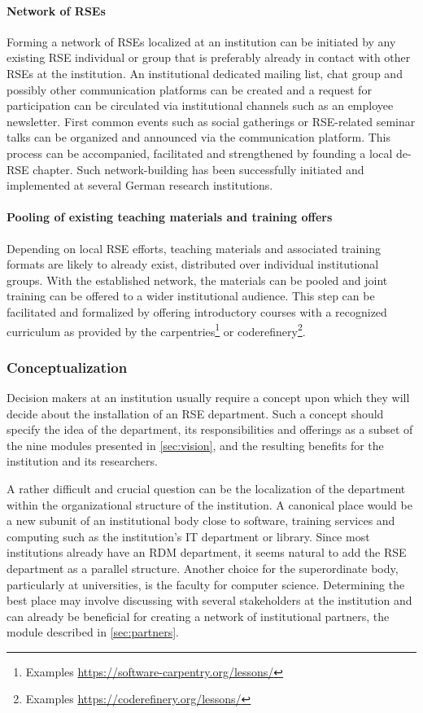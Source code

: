 \documentclass[a4paper]{article}
\begin{document}
\paragraph{Network of RSEs}
Forming a network of RSEs localized at an institution can be initiated by any existing RSE individual or group that is preferably already in contact with other RSEs at the institution.
An institutional dedicated mailing list, chat group and possibly other communication platforms can be created and a request for participation can be circulated via institutional channels such as an employee newsletter.
First common events such as social gatherings or RSE-related seminar talks can be organized and announced via the communication platform.
This process can be accompanied, facilitated and strengthened by founding a local de-RSE chapter.
Such network-building has been successfully initiated and implemented at several German research institutions.

\paragraph{Pooling of existing teaching materials and training offers}
Depending on local RSE efforts, teaching materials and associated training formats are likely to already exist,
distributed over individual institutional groups.
With the established network, the materials can be pooled and joint training can be offered to a wider institutional audience.
This step can be facilitated and formalized by offering introductory courses with a recognized curriculum as provided by the carpentries\footnote{Examples \url{https://software-carpentry.org/lessons/}}
or coderefinery\footnote{Examples \url{https://coderefinery.org/lessons/}}.

\subsubsection{Conceptualization}
Decision makers at an institution usually require a concept upon which they will decide about the installation of an RSE department.
Such a concept should specify the idea of the department, its responsibilities and offerings as a subset of the nine modules presented in \autoref{sec:vision}, and the resulting benefits for the institution and its researchers.

A rather difficult and crucial question can be the localization of the department within the organizational structure of the institution.
A canonical place would be a new subunit of an institutional body close to software,
training services and computing such as the institution's IT department or library.
Since most institutions already have an RDM department, it seems natural to add the RSE department as a parallel structure.
Another choice for the superordinate body, particularly at universities, is the faculty for computer science.
Determining the best place may involve discussing with several stakeholders at the institution and can already be beneficial for creating a
network of institutional partners, the module described in \autoref{sec:partners}.
\end{document}
